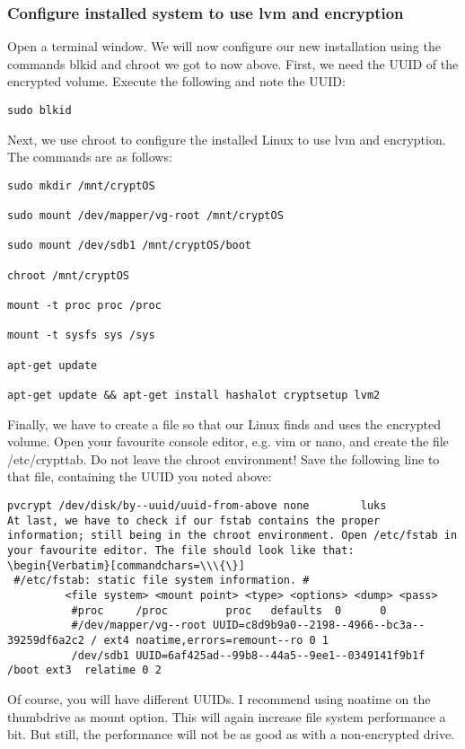 \documentclass[12pt,a4paper]{article}
\begin{document}
\subsubsection{Configure installed system to use lvm and encryption}
Open a terminal window. We will now configure our new installation using the commands blkid and chroot we got to now above. First, we need the UUID of the encrypted volume. Execute the following and note the UUID:
\begin{Verbatim}[commandchars=\\\{\}]
sudo blkid
\end{Verbatim}
Next, we use chroot to configure the installed Linux to use lvm and encryption. The commands are as follows:
\begin{Verbatim}[commandchars=\\\{\}]
sudo mkdir /mnt/cryptOS

sudo mount /dev/mapper/vg-root /mnt/cryptOS

sudo mount /dev/sdb1 /mnt/cryptOS/boot

chroot /mnt/cryptOS

mount -t proc proc /proc

mount -t sysfs sys /sys

apt-get update

apt-get update && apt-get install hashalot cryptsetup lvm2
\end{Verbatim}
Finally, we have to create a file so that our Linux finds and uses the encrypted volume. Open your favourite console editor, e.g. vim or nano, and create the file /etc/crypttab. Do not leave the chroot environment! Save the following line to that file, containing the UUID you noted above:
\begin{Verbatim}[commandchars=\\\{\}]
pvcrypt	/dev/disk/by-­‐uuid/uuid-from-above	none		luks
At last, we have to check if our fstab contains the proper information; still being in the chroot environment. Open /etc/fstab in your favourite editor. The file should look like that:
\begin{Verbatim}[commandchars=\\\{\}]
 #/etc/fstab: static file system information. #
		 <file system> <mount point> <type> <options> <dump> <pass>	
		  #proc		/proc	      proc   defaults  0      0		
		  #/dev/mapper/vg-­‐root UUID=c8d9b9a0-­‐2198-­‐4966-­‐bc3a-­‐39259df6a2c2 / ext4 noatime,errors=remount-­‐ro 0 1  
		  /dev/sdb1 UUID=6af425ad-­‐99b8-­‐44a5-­‐9ee1-­‐0349141f9b1f /boot ext3  relatime 0 2
\end{Verbatim}
Of course, you will have different UUIDs. I recommend using noatime on the thumbdrive as mount option. This will again increase file system performance a bit. But still, the performance will not be as good as with a non-encrypted drive.
\end{document}
